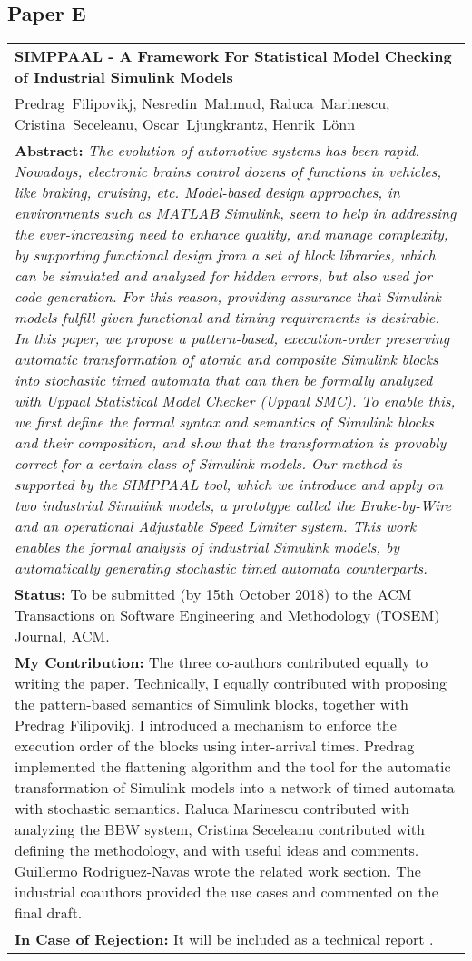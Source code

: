 \subsection{Paper E}
\begin{tabular}{p{\textwidth}}
\textbf{SIMPPAAL - A Framework For Statistical Model Checking of Industrial Simulink Models}\\%
Predrag~Filipovikj, Nesredin~Mahmud, Raluca~Marinescu, Cristina~Seceleanu, Oscar~Ljungkrantz, Henrik~L\"{o}nn
\\[6pt]%
\noindent \textbf{Abstract:} \textit{The evolution of automotive systems has been rapid. Nowadays, electronic brains control dozens of functions in vehicles, like
braking, cruising, etc. Model-based design approaches, in environments such as MATLAB Simulink, seem to help in addressing
the ever-increasing need to enhance quality, and manage complexity, by supporting functional design from a set of block
libraries, which can be simulated and analyzed for hidden errors, but also used for code generation. For this reason, providing
assurance that Simulink models fulfill given functional and timing requirements is desirable. In this paper, we propose a
pattern-based, execution-order preserving automatic transformation of atomic and composite Simulink blocks into stochastic
timed automata that can then be formally analyzed with Uppaal Statistical Model Checker (Uppaal SMC). To enable this, we
first define the formal syntax and semantics of Simulink blocks and their composition, and show that the transformation is
provably correct for a certain class of Simulink models. Our method is supported by the SIMPPAAL tool, which we introduce
and apply on two industrial Simulink models, a prototype called the Brake-by-Wire and an operational Adjustable Speed
Limiter system. This work enables the formal analysis of industrial Simulink models, by automatically generating stochastic
timed automata counterparts.}
\\[6pt]%
\noindent \textbf{Status:} To be submitted (by 15th October 2018)  to the ACM Transactions on Software Engineering and Methodology (TOSEM) Journal, ACM. 
\\%
\textbf{My Contribution: } The three co-authors contributed equally to writing the paper. Technically, I equally contributed with proposing the pattern-based semantics of Simulink blocks, together with Predrag Filipovikj. I introduced a mechanism to enforce the execution order of the blocks using inter-arrival times. Predrag implemented the flattening algorithm and the tool for the automatic transformation of Simulink models into a network of timed automata with stochastic semantics. Raluca Marinescu contributed with analyzing the BBW system, Cristina Seceleanu contributed with defining the methodology, and with useful ideas and comments. Guillermo Rodriguez-Navas wrote the related work section. The industrial coauthors provided the use cases and commented on the final draft.\\%
\textbf{In Case of Rejection: } It will be included as a technical report \cite{Filipovikj4714}. \\
\end{tabular}

